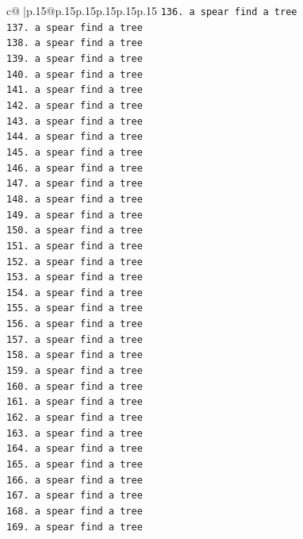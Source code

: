 \documentclass{article}
\begin{document}
{\begin{supertabular}{c@{$\;$}|p{.15\linewidth}@{}p{.15\linewidth}p{.15\linewidth}p{.15\linewidth}p{.15\linewidth}p{.15\linewidth}}
{{{\texttt{136. a spear find a tree} \\
\texttt{137. a spear find a tree} \\
\texttt{138. a spear find a tree} \\
\texttt{139. a spear find a tree} \\
\texttt{140. a spear find a tree} \\
\texttt{141. a spear find a tree} \\
\texttt{142. a spear find a tree} \\
\texttt{143. a spear find a tree} \\
\texttt{144. a spear find a tree} \\
\texttt{145. a spear find a tree} \\
\texttt{146. a spear find a tree} \\
\texttt{147. a spear find a tree} \\
\texttt{148. a spear find a tree} \\
\texttt{149. a spear find a tree} \\
\texttt{150. a spear find a tree} \\
\texttt{151. a spear find a tree} \\
\texttt{152. a spear find a tree} \\
\texttt{153. a spear find a tree} \\
\texttt{154. a spear find a tree} \\
\texttt{155. a spear find a tree} \\
\texttt{156. a spear find a tree} \\
\texttt{157. a spear find a tree} \\
\texttt{158. a spear find a tree} \\
\texttt{159. a spear find a tree} \\
\texttt{160. a spear find a tree} \\
\texttt{161. a spear find a tree} \\
\texttt{162. a spear find a tree} \\
\texttt{163. a spear find a tree} \\
\texttt{164. a spear find a tree} \\
\texttt{165. a spear find a tree} \\
\texttt{166. a spear find a tree} \\
\texttt{167. a spear find a tree} \\
\texttt{168. a spear find a tree} \\
\texttt{169. a spear find a tree} \\
}}}
\end{supertabular}}
\end{document}
